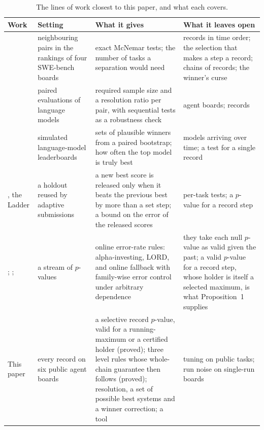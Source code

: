\documentclass[11pt]{article}
\begin{document}
\begin{table}[t]
\centering\small
\begin{tabular}{p{2.8cm}p{3.0cm}p{4.7cm}p{4.1cm}}
\toprule
Work & Setting & What it gives & What it leaves open \\
\midrule
\citet{liu2026converged} & neighbouring pairs in the rankings of four SWE-bench boards & exact McNemar tests; the number of tasks a separation would need & records in time order; the selection that makes a step a record; chains of records; the winner's curse \\
\citet{kotawala2026resolution} & paired evaluations of language models & required sample size and a resolution ratio per pair, with sequential tests as a robustness check & agent boards; records \\
\citet{jain2026lottery} & simulated language-model leaderboards & sets of plausible winners from a paired bootstrap; how often the top model is truly best & models arriving over time; a test for a single record \\
\citet{blum2015ladder}, the Ladder & a holdout reused by adaptive submissions & a new best score is released only when it beats the previous best by more than a set step; a bound on the error of the released scores & per-task tests; a $p$-value for a record step \\
\citet{foster2008alphainvesting}; \citet{ramdas2017lord}; \citet{tian2021onlinefwer} & a stream of $p$-values & online error-rate rules: alpha-investing, LORD, and online fallback with family-wise error control under arbitrary dependence & they take each null $p$-value as valid given the past; a valid $p$-value for a record step, whose holder is itself a selected maximum, is what Proposition~1 supplies \\
\addlinespace
This paper & every record on six public agent boards & a selective record $p$-value, valid for a running-maximum or a certified holder (proved); three level rules whose whole-chain guarantee then follows (proved); resolution, a set of possible best systems and a winner correction; a tool & tuning on public tasks; run noise on single-run boards \\
\bottomrule
\end{tabular}
\caption{The lines of work closest to this paper, and what each covers.}
\label{tab:related}
\end{table}
\end{document}
